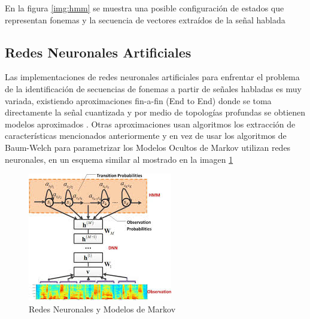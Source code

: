 En la figura \ref{img:hmm} se muestra una posible configuración de estados que representan fonemas y la secuencia de vectores extraídos de la señal hablada

\subsection{Redes Neuronales Artificiales}

Las implementaciones de redes neuronales artificiales para enfrentar el problema de la identificación de secuencias de fonemas a partir de señales habladas es muy variada, existiendo aproximaciones fin-a-fin (End to End) donde se toma directamente la señal cuantizada y por medio de topologías profundas se obtienen modelos aproximados \cite{Hannun2014}. Otras aproximaciones usan algoritmos los extracción de características mencionados anteriormente y en vez de usar los algoritmos de Baum-Welch  para parametrizar los Modelos Ocultos de Markov utilizan redes neuronales, en un esquema similar al mostrado en la imagen \ref{img:cd-dnn-hmm}

\begin{figure}[H]

\centering
\caption{Redes Neuronales y Modelos de Markov \cite{Deng2012}}
\label{img:cd-dnn-hmm}
\includegraphics[]{imagenes/cd-dnn-hmm.jpeg}
\end{figure}


